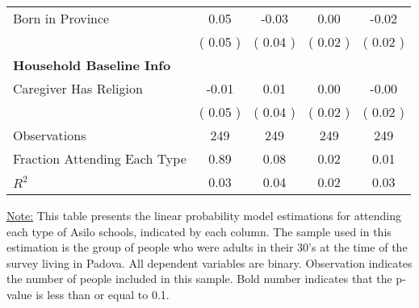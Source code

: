 \begin{table}[H]
{\begin{tabular}{lcccc}
\quad Born in Province &      0.05 &     -0.03 &      0.00 &     -0.02 \\
\quad  & (     0.05 ) & (     0.04 )  & (     0.02 )  & (     0.02 )  \\
\midrule
\textbf{Household Baseline Info} \\
\quad Caregiver Has Religion &     -0.01 &      0.01 &      0.00 &     -0.00 \\
\quad  & (     0.05 ) & (     0.04 )  & (     0.02 )  & (     0.02 )  \\
\midrule
Observations & 249 & 249 & 249 & 249 \\
Fraction Attending Each Type &      0.89 &      0.08 &      0.02 &      0.01 \\
\midrule
$ R^2$ &      0.03 &      0.04 &      0.02 &      0.03 \\
\bottomrule
\end{tabular}}
\end{table}
\begin{footnotesize}
\noindent\underline{Note:} This table presents the linear probability model estimations for attending each type of Asilo schools, indicated by each column. The sample used in this estimation is the group of people who were adults in their 30's at the time of the survey living in Padova. All dependent variables are binary. Observation indicates the number of people included in this sample. Bold number indicates that the p-value is less than or equal to 0.1.
\end{footnotesize}
